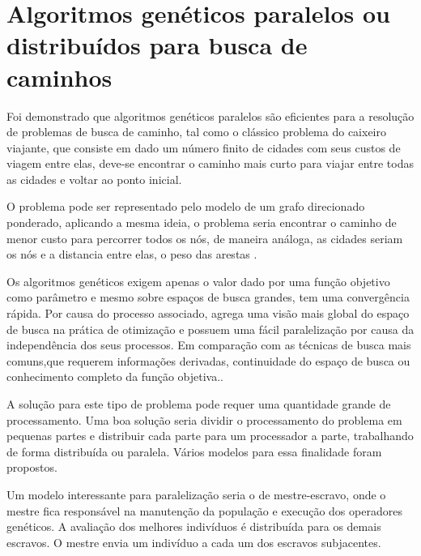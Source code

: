 


\section{Algoritmos genéticos paralelos ou distribuídos para busca de caminhos}

Foi demonstrado que algoritmos genéticos paralelos são eficientes para a resolução de problemas de busca de caminho, tal como o clássico problema do caixeiro viajante, que consiste em dado um número finito de cidades com seus custos de viagem entre elas, deve-se encontrar o caminho mais curto para viajar entre todas as cidades e voltar ao ponto inicial. 

O problema pode ser representado pelo modelo de um grafo direcionado ponderado, aplicando a mesma ideia, o problema seria encontrar o caminho de menor custo para percorrer todos os nós, de maneira análoga, as cidades seriam os nós e a distancia entre elas, o peso das arestas \cite{Jason}\cite{Alaoui}\cite{Heinz}.

Os algoritmos genéticos exigem apenas o valor dado por uma função objetivo como parâmetro e mesmo sobre espaços de busca grandes, tem uma convergência rápida. Por causa do processo associado, agrega uma visão mais global do espaço de busca na prática de otimização e possuem uma fácil paralelização por causa da independência dos seus processos. Em comparação com as técnicas de busca mais comuns,que requerem informações derivadas, continuidade do espaço de busca ou conhecimento completo da função objetiva.\cite{Vilson}.

A solução para este tipo de problema pode requer uma quantidade grande de processamento. Uma boa solução seria dividir o processamento do problema em pequenas partes e distribuir cada parte para um processador a parte, trabalhando de forma distribuída ou paralela. Vários modelos para essa finalidade foram propostos.

Um modelo interessante para paralelização seria o de mestre-escravo, onde o mestre fica responsável na manutenção da população e execução dos operadores genéticos. A avaliação dos melhores indivíduos é distribuída para os demais escravos. O mestre envia um indivíduo a cada um dos escravos subjacentes. 

